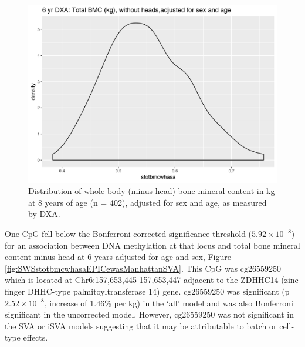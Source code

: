 \documentclass[
]{book}
\begin{document}
\begin{figure}

{\centering \includegraphics[width=0.8\linewidth]{figs/SWS6yrBMCdist} 

}

\caption{Distribution of whole body (minus head) bone mineral content in kg at 8 years of age (n = 402), adjusted for sex and age, as measured by DXA.}\label{fig:SWSstotbmcwhasa}
\end{figure}



One CpG fell below the Bonferroni corrected significance threshold (\(5.92\times10^{-8}\)) for an association between DNA methylation at that locus and total bone mineral content minus head at 6 years adjusted for age and sex, Figure \ref{fig:SWSstotbmcwhasaEPICewasManhattanSVA}. This CpG was cg26559250 which is located at Chr6:157,653,445-157,653,447 adjacent to the ZDHHC14 (zinc finger DHHC-type palmitoyltransferase 14) gene. cg26559250 was significant (p = \(2.52\times 10^{-8}\), increase of 1.46\% per kg) in the `all' model and was also Bonferroni significant in the uncorrected model. However, cg26559250 was not significant in the SVA or iSVA models suggesting that it may be attributable to batch or cell-type effects.
\end{document}
